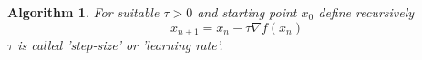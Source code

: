 \documentclass[17pt]{extarticle}
\newtheorem*{algorithm*}{Algorithm}
\begin{document}
\begin{algorithm*}
	For suitable $\tau>0$ and starting point $x_0$ define recursively
	$$
	x_{n+1}=x_{n}-\tau\nabla f(x_n)
	$$
    $\tau$ is called 'step-size' or 'learning rate'.	
\end{algorithm*}
\end{document}
